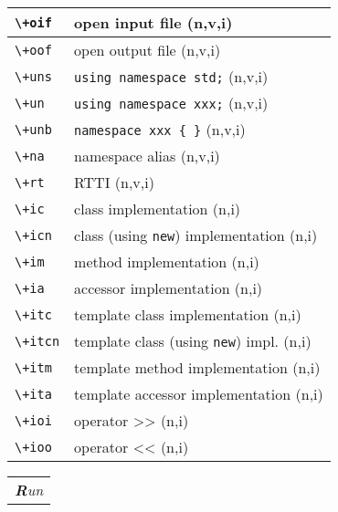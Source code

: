 \documentclass[oneside,11pt,landscape,DIV16]{scrartcl}
\begin{document}
\begin{multicols}{3}
\begin{center}
\begin{tabular}[]{|p{12mm}|p{60mm}|}
\hline \verb'\+oif' & open input file                      \hfill (n,v,i)\\
\hline \verb'\+oof' & open output file                     \hfill (n,v,i)\\
\hline \verb'\+uns' & \verb'using namespace std;'          \hfill (n,v,i)\\
\hline \verb'\+un'  & \verb'using namespace xxx;'          \hfill (n,v,i)\\
\hline \verb'\+unb' & \verb'namespace xxx { }'             \hfill (n,v,i)\\
\hline \verb'\+na'  & namespace alias                      \hfill (n,v,i)\\
\hline \verb'\+rt'  & RTTI                                 \hfill (n,v,i)\\
%
\hline
\hline \verb'\+ic'  & class  implementation                   \hfill (n,i)\\
\hline \verb'\+icn' & class (using \verb'new') implementation \hfill (n,i)\\
\hline \verb'\+im'  & method implementation                   \hfill (n,i)\\
\hline \verb'\+ia'  & accessor implementation                 \hfill (n,i)\\
\hline \verb'\+itc' & template class  implementation          \hfill (n,i)\\
\hline \verb'\+itcn'& template class (using \verb'new') impl. \hfill (n,i)\\
\hline \verb'\+itm' & template method implementation          \hfill (n,i)\\
\hline \verb'\+ita' & template accessor implementation        \hfill (n,i)\\
\hline \verb'\+ioi' & operator >>                             \hfill (n,i)\\
\hline \verb'\+ioo' & operator <<                             \hfill (n,i)\\
\hline 
\end{tabular}
%
\vspace{100mm}
\begin{tabular}[]{|p{12mm}|p{58mm}|}
\hline
\multicolumn{2}{|r|}{\textsl{\textbf{R}un}} \\

\end{tabular}
\end{center}
\end{multicols}
\end{document}
